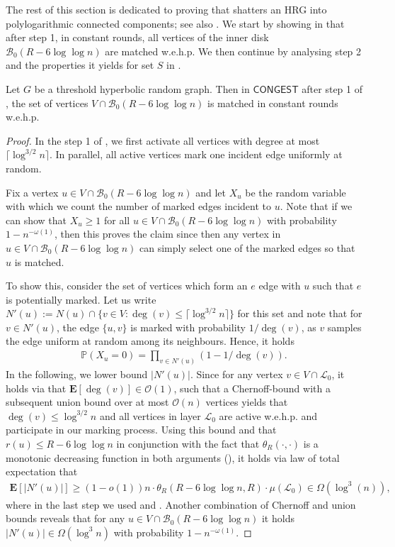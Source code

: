 \documentclass[letterpaper,11pt]{article}
\newcommand{\E}[1]{\mathbf{E}\left[#1\right]}
\newcommand{\Pro}[1]{\mathbb{P}\left(#1\right)}
\newcommand{\wehp}{w.e.h.p.\xspace}
\newcommand{\B}{\mathcal B}
\newcommand{\1}{\mathbb I}
\newcommand{\bigO}{\mathcal{O}}
\newcommand{\CONGEST}{\ensuremath{\mathsf{CONGEST}}\xspace}
\newcommand{\Layer}[1]{\mathcal{L}_{#1}}
\begin{document}
%
The rest of this section is dedicated to proving that \algos shatters an HRG into polylogarithmic connected components; see also . We start by showing in  that after step 1, in constant rounds, all vertices of the inner disk $\B_0(R - 6\log\log n)$ are matched \wehp We then continue by analysing step 2 and the properties it yields for set $S$ in .
%
\begin{lemma} \label{lem:match-inner-disk}
    Let $G$ be a threshold hyperbolic random graph. Then in \CONGEST after step 1 of \algos, the set of vertices $V \cap \B_0(R- 6\log\log n)$ is matched in constant rounds \wehp
\end{lemma}
%
\begin{proof}
    In the step 1 of \algos, we first activate all vertices with degree at most $\lceil\log^{3/2} n\rceil$. In parallel, all active vertices mark one incident edge uniformly at random.
    
    Fix a vertex $u \in V \cap \B_0(R- 6\log\log n)$ and let $X_u$ be the random variable with which we count the number of marked edges incident to $u$. Note that if we can show that $X_u \geq 1$ for all $u  \in V \cap \B_0(R- 6\log\log n)$ with probability $1 - n^{-\omega(1)}$, then this proves the claim since then any vertex in $u \in V \cap \B_0(R- 6\log\log n)$ can simply select one of the marked edges so that $u$ is matched.
    
To show this, consider the set of vertices which form an $e$ edge with $u$ such that $e$ is potentially marked. Let us write $N'(u) := N(u) \cap \{v \in V : \deg(v) \leq \lceil\log^{3/2} n\rceil\}$ for this set and note that for $v \in N'(u)$, the edge $\{u,v\}$ is marked with probability $1/\deg(v)$, as $v$ samples the edge uniform at random among its neighbours. Hence, it holds
%
\begin{align}\label{eq:prob-bad-event}
    \Pro{X_u = 0} = \prod_{v \in N'(u)}(1-1/\deg(v)).
\end{align}
%
In the following, we lower bound $|N'(u)|$. Since for any vertex $v \in V \cap \Layer{0}$, it holds via  that $\E{\deg(v)} \in \bigO(1)$, such that a Chernoff-bound with a subsequent union bound over at most $\bigO(n)$ vertices yields that $\deg(v) \leq \log^{3/2}n$ and all vertices in layer $\Layer{0}$ are active \wehp and participate in our marking process. Using this bound and that $r(u) \leq R - 6\log\log n$ in conjunction with the fact that $\theta_R(\cdot, \cdot)$ is a monotonic decreasing function in both arguments (), it holds via law of total expectation that
%
\begin{align*}
    \E{|N'(u)|} \geq (1-o(1)) n\cdot \theta_R(R - 6\log\log n, R)\cdot \mu(\Layer{0}) \in \Omega(\log^3(n)),
\end{align*}
%
where in the last step we used  and  . Another combination of Chernoff and union bounds reveals that for any $u \in V \cap \B_0(R- 6\log\log n)$ it holds $|N'(u)| \in \Omega(\log^3 n)$ with probability $1 - n^{-\omega(1)}$.


\end{proof}
\end{document}
